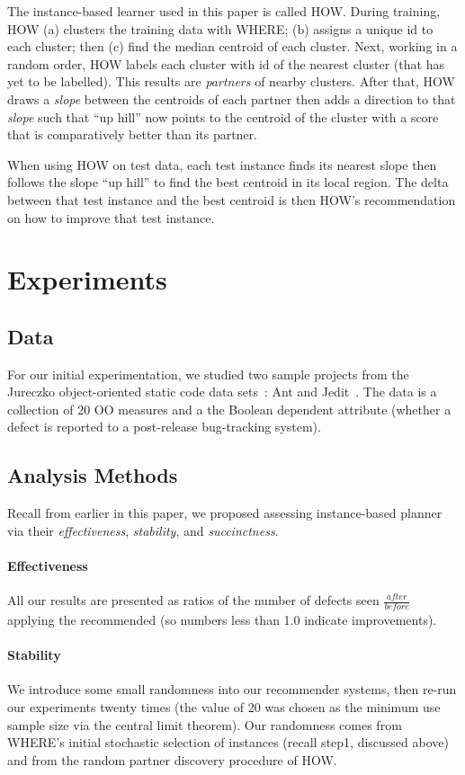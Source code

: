 \documentclass[conference]{IEEEtran}
\begin{document}
The instance-based learner used in this paper is called HOW.
During training, HOW  (a) clusters the training data with WHERE; (b) assigns a unique id to each cluster; then  (c) find the median centroid of each cluster.
Next,  working in a random order, HOW labels each cluster with id of the  nearest cluster (that has yet to be labelled). This results are {\em partners}  of nearby clusters.
After that, HOW draws a {\em slope} between the centroids of each partner
then adds a direction to that {\em slope}
such that ``up hill'' now points to the centroid of the cluster with a score that is
comparatively better than its partner.

When using HOW on test data, each test instance finds its nearest slope then follows
the slope ``up hill'' to find the best centroid in its local region.
The delta between that test instance and the best centroid is then HOW's
recommendation on how to improve that test instance.

	\section{Experiments}
	\subsection{Data}
	For our initial experimentation, we studied two sample projects from the Jureczko object-oriented static code data sets~\cite{jureczko10}: Ant and  Jedit~\cite{promiserepo}. The data is a collection of 20 OO measures and a the Boolean dependent attribute (whether a defect is reported to a post-release bug-tracking system). 
	
	\subsection{Analysis Methods}
	Recall from earlier in this paper, we proposed assessing instance-based planner
	via their {\em effectiveness}, {\em stability}, and  {\em succinctness}.

	\paragraph{Effectiveness} All our results are  presented as ratios of the number of defects seen $\frac{\mathit{after}}{\mathit{before}}$ applying the recommended  (so numbers less than 1.0 indicate improvements). 
	\paragraph{Stability} We introduce some small randomness into our recommender systems, then re-run our experiments twenty times (the value of 20 was chosen as the minimum use sample size via the central limit theorem). Our randomness comes from WHERE's initial stochastic selection of instances (recall step1, discussed above) and from the random partner discovery procedure of HOW.
\end{document}
